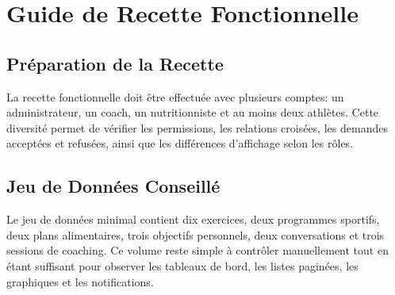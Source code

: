 \chapter{Guide de Recette Fonctionnelle}
\minitoc
\newpage

\section{Préparation de la Recette}
La recette fonctionnelle doit être effectuée avec plusieurs comptes: un administrateur, un coach, un nutritionniste et au moins deux athlètes. Cette diversité permet de vérifier les permissions, les relations croisées, les demandes acceptées et refusées, ainsi que les différences d'affichage selon les rôles.

\section{Jeu de Données Conseillé}
Le jeu de données minimal contient dix exercices, deux programmes sportifs, deux plans alimentaires, trois objectifs personnels, deux conversations et trois sessions de coaching. Ce volume reste simple à contrôler manuellement tout en étant suffisant pour observer les tableaux de bord, les listes paginées, les graphiques et les notifications.

